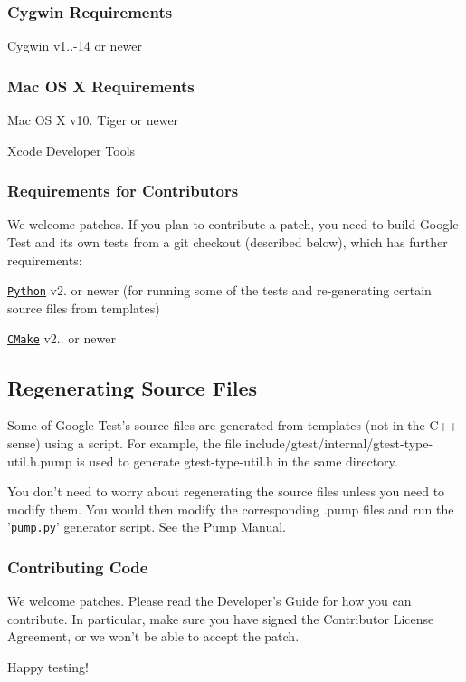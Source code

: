 \subsubsection*{Cygwin Requirements}


\begin{DoxyItemize}
\item Cygwin v1..-\/14 or newer
\end{DoxyItemize}

\subsubsection*{Mac O\-S X Requirements}


\begin{DoxyItemize}
\item Mac O\-S X v10. Tiger or newer
\item Xcode Developer Tools
\end{DoxyItemize}

\subsubsection*{Requirements for Contributors}

We welcome patches. If you plan to contribute a patch, you need to build Google Test and its own tests from a git checkout (described below), which has further requirements\-:


\begin{DoxyItemize}
\item \href{https://www.python.org/}{\tt Python} v2. or newer (for running some of the tests and re-\/generating certain source files from templates)
\item \href{https://cmake.org/}{\tt C\-Make} v2.. or newer
\end{DoxyItemize}

\subsection*{Regenerating Source Files}

Some of Google Test's source files are generated from templates (not in the C++ sense) using a script. For example, the file include/gtest/internal/gtest-\/type-\/util.\-h.\-pump is used to generate gtest-\/type-\/util.\-h in the same directory.

You don't need to worry about regenerating the source files unless you need to modify them. You would then modify the corresponding {\ttfamily .pump} files and run the '\href{googletest/scripts/pump.py}{\tt pump.\-py}' generator script. See the Pump Manual.

\subsubsection*{Contributing Code}

We welcome patches. Please read the Developer's Guide for how you can contribute. In particular, make sure you have signed the Contributor License Agreement, or we won't be able to accept the patch.

Happy testing! 